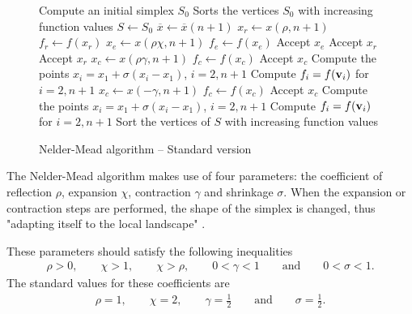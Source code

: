 \begin{figure}[htbp]
\begin{algorithmic}
\STATE Compute an initial simplex $S_0$
\STATE Sorts the vertices $S_0$ with increasing function values
\STATE $S\gets S_0$
  \STATE $\overline{x}\gets \overline{x}(n+1)$
  \STATE $x_r \gets x(\rho,n+1)$ 
  \STATE $f_r \gets f(x_r)$ 
    \STATE $x_e \gets x(\rho\chi,n+1)$ 
    \STATE $f_e \gets f(x_e)$ 
      \STATE Accept $x_e$
    \ELSE
      \STATE Accept $x_r$
    \ENDIF
    \STATE Accept $x_r$
    \STATE $x_c \gets x(\rho\gamma,n+1)$ 
    \STATE $f_c \gets f(x_c)$ 
      \STATE Accept $x_c$
    \ELSE
      \STATE Compute the points $x_i=x_1 + \sigma (x_i - x_1)$, $i=2,n+1$ 
      \STATE Compute $f_i = f(\mathbf{v}_i)$ for $i=2,n+1$
    \ENDIF
  \ELSE
    \STATE $x_c \gets x(-\gamma,n+1)$ 
    \STATE $f_c \gets f(x_c)$ 
      \STATE Accept $x_c$
    \ELSE
      \STATE Compute the points $x_i=x_1 + \sigma (x_i - x_1)$, $i=2,n+1$ 
      \STATE Compute $f_i = f(\mathbf{v}_i)$ for $i=2,n+1$
    \ENDIF
  \ENDIF
  \STATE Sort the vertices of $S$ with increasing function values
\ENDWHILE
\end{algorithmic}
\caption{Nelder-Mead algorithm -- Standard version}
\label{algo-neldermead}
\end{figure}

The Nelder-Mead algorithm makes use of four parameters: the 
coefficient of reflection $\rho$, expansion $\chi$, 
contraction $\gamma$ and shrinkage $\sigma$.
When the expansion or contraction steps are performed, the shape 
of the simplex is changed, thus "adapting itself to the 
local landscape" \cite{citeulike:3009487}.

These parameters should satisfy the following inequalities \cite{citeulike:3009487,lagarias:112}
\begin{eqnarray}
\label{condition-coeffs}
\rho>0, \qquad \chi > 1, \qquad \chi > \rho, \qquad 0<\gamma<1 \qquad \textrm{and} \qquad 0<\sigma<1.
\end{eqnarray}
The standard values for these coefficients are 
\begin{eqnarray}
\label{standard-coeffs}
\rho=1, \qquad \chi =2, \qquad \gamma=\frac{1}{2} \qquad \textrm{and} \qquad \sigma=\frac{1}{2}.
\end{eqnarray}

